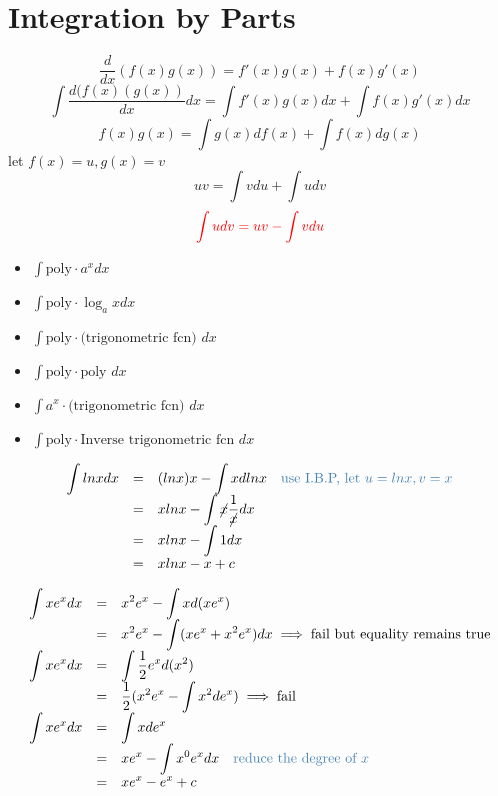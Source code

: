 \section{Integration by Parts}
\begin{defn}
$$\displaystyle \frac{d}{dx} (f(x)g(x)) = f'(x)g(x)+f(x)g'(x)$$
$$\displaystyle \int \frac{d(f(x)(g(x))}{dx} dx = \int f'(x)g(x) dx + \int f(x)g'(x) dx$$
$$\displaystyle f(x)g(x) = \int g(x) df(x) + \int f(x) dg(x)$$
let $f(x) = u, g(x) = v$
$$uv = \int v du + \int u dv$$
$$\color{red}\int udv = uv - \int v du$$
\end{defn}
\begin{notn}
\begin{itemize}
\item $\displaystyle \int \text{poly} \cdot a^x dx$
\item $\displaystyle \int \text{poly} \cdot \log_a x dx$
\item $\displaystyle \int \text{poly} \cdot \text{(trigonometric fcn) } dx$
\item $\displaystyle \int \text{poly} \cdot \text{poly } dx$
\item $\displaystyle \int a^x \cdot \text{(trigonometric fcn) }dx$
\item $\displaystyle \int \text{poly} \cdot \text{Inverse trigonometric fcn } dx$
\end{itemize}
\end{notn}
\begin{eg}
$$\begin{array}{rcl}
\displaystyle \int ln x dx & = & \displaystyle (ln x)x - \int x d lnx \quad \tssteelblue{\text{use I.B.P, let }u= ln x, v=x}\\
& = & \displaystyle xlnx - \int \cancel{x} \frac{1}{\cancel{x}} dx\\
& = & \displaystyle xlnx - \int 1 dx\\
& = & \displaystyle xlnx -x + c 
\end{array}$$
\end{eg}
\begin{eg}
$$\begin{array}{rcl}
\displaystyle \int x e^x dx & = & \displaystyle x^2 e^x - \int x d(xe^x)\\
& = & \displaystyle x^2 e^x - \int (xe^x + x^2e^x) dx \implies \text{fail but equality remains true}\\
\displaystyle \int xe^xdx & = & \displaystyle \int \frac{1}{2} e^xd(x^2)\\
& = & \displaystyle \frac{1}{2} (x^2e^x - \int x^2de^x) \implies \text{fail}\\
\displaystyle \int xe^x dx & = & \displaystyle \int x de^x\\
& = & \displaystyle xe^x - \int x^0 e^xdx \quad \tssteelblue{\text{reduce the degree of }x}\\
& = & \displaystyle xe^x - e^x + c
\end{array}$$
\end{eg}
